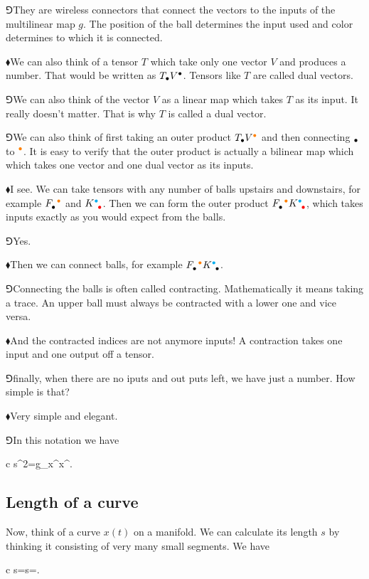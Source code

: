 \documentclass[10pt,oneside%
]{memoir}
\newenvironment{eqna}{\begin{IEEEeqnarray*}{c}}{\end{IEEEeqnarray*}\ignorespacesafterend}
\newcommand{\dd}{\mathrm{d}}
\newcommand{\tensay}[3]{#1_{#2}^{\phantom{#2}#3}}
\newcommand{\tensya}[3]{#1^{#2}_{\phantom{#2}#3}}
\newcommand{\coa}{{\color{black}\bullet}}
\newcommand{\cob}{{\color{oranssi}\bullet}}
\newcommand{\coc}{{\color{cyan}\bullet}}
\newcommand{\cod}{{\color{red}\bullet}}
\newcommand{\hea}{\(\blacklozenge\)\;}
\newcommand{\heb}{\(\Game\)\;}
\begin{document}
\heb They are wireless connectors that connect the vectors to the inputs of the multilinear map \(g\). The position of the ball determines the input used and color determines to which it is connected.

\hea We can also think of a tensor \(T\) which take only one vector \(V\) and produces a number. That would be written as \(T_\coa V^\coa\). Tensors like \(T\) are called dual vectors.

\heb We can also think of the vector \(V\) as a linear map which takes \(T\) as its input. It really doesn't matter. That is why \(T\) is called a dual vector.

\heb We can also think of first taking an outer product \(T_\coa V^\cob\) and then connecting \(_\coa\) to \(^\cob\). It is easy to verify that the outer product is actually a bilinear map which which takes one vector and one dual vector as its inputs.

\hea I see. We can take tensors with any number of balls upstairs and downstairs, for example \(\tensay{F}{\coa}{\cob}\) and \(\tensya{K}{\coc}{\cod}\). Then we can form the outer product \(\tensay{F}{\coa}{\cob}\tensya{K}{\coc}{\cod}\), which takes inputs exactly as you would expect from the balls.

\heb Yes.

\hea Then we can connect balls, for example \(\tensay{F}{\coa}{\cob}\tensya{K}{\coc}{\coa}\).

\heb Connecting the balls is often called contracting. Mathematically it means taking a trace. An upper ball must always be contracted with a lower one and vice versa.

\hea And the contracted indices are not anymore inputs! A contraction takes one input and one output off a tensor.

\heb finally, when there are no iputs and out puts left, we have just a number. How simple is that?

\hea Very simple and elegant.

\heb In this notation we have
\begin{eqna}
    \dd s^2=g_{\coa\cob}\dd x^\coa\dd x^\cob.
\end{eqna}
\subsection{Length of a curve}
Now, think of a curve \(x(t)\) on a manifold. We can calculate its length \(s\) by thinking it consisting of very many small segments. We have
\begin{eqna}
    s=\int\dd s=\int\sqrt{g_{\coa\cob}\dd x^\coa\dd x^\cob}.
\end{eqna}
\end{document}
